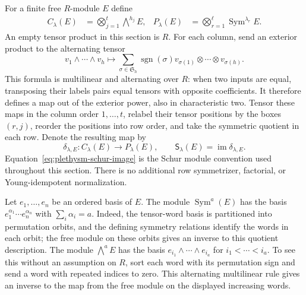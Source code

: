 For a finite free $R$-module $E$ define
\begin{align}
 C_\lambda(E)&=\bigotimes_{j=1}^{t}\bigwedge^{h_j}E,
 &P_\lambda(E)&=\bigotimes_{r=1}^{\ell}\operatorname{Sym}^{\lambda_r}E.
 \label{eq:plethysm-column-row-modules}
\end{align}
An empty tensor product in this section is $R$.
For each column, send an exterior product to the alternating tensor
\[
 v_1\wedge\cdots\wedge v_h\longmapsto
 \sum_{\sigma\in\mathfrak S_h}\operatorname{sgn}(\sigma)
 v_{\sigma(1)}\otimes\cdots\otimes v_{\sigma(h)}.
\]
This formula is multilinear and alternating over $R$: when two inputs
are equal, transposing their labels pairs equal tensors with opposite
coefficients. It therefore defines a map out of the exterior power,
also in characteristic two. Tensor these maps in the column order
$1,\ldots,t$, relabel their tensor positions by the boxes $(r,j)$,
reorder the positions into row order, and take the symmetric quotient
in each row. Denote the resulting map by
\begin{equation}
 \delta_{\lambda,E}:C_\lambda(E)\longrightarrow P_\lambda(E),
 \qquad
 \mathsf S_\lambda(E)=\operatorname{im}\delta_{\lambda,E}.
 \label{eq:plethysm-schur-image}
\end{equation}
Equation~\eqref{eq:plethysm-schur-image} is the Schur module convention
used throughout this section. There is no additional row
symmetrizer, factorial, or Young-idempotent normalization.

Let $e_1,\ldots,e_n$ be an ordered basis of $E$.
The module $\operatorname{Sym}^a(E)$ has the basis
$e_1^{\alpha_1}\cdots e_n^{\alpha_n}$ with
$\sum_i\alpha_i=a$. Indeed, the tensor-word basis is partitioned into
permutation orbits, and the defining symmetry relations identify the
words in each orbit; the free module on these orbits gives an inverse
to this quotient description. The module $\bigwedge^a E$ has the basis
$e_{i_1}\wedge\cdots\wedge e_{i_a}$ for
$i_1<\cdots<i_a$. To see this without an assumption on $R$, sort each
word with its permutation sign and send a word with repeated indices
to zero. This alternating multilinear rule gives an inverse to the
map from the free module on the displayed increasing words.

